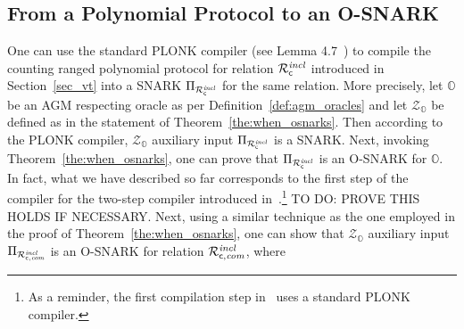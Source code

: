 \subsection{From a Polynomial Protocol to an O-SNARK}
\label{sec:interesting}
\noindent One can use the standard PLONK compiler (see Lemma 4.7~\cite{plonk}) to compile the 
counting ranged polynomial protocol for relation $\mathcal{R}^{\mathit{incl}}_{\mathsf{c}}$ introduced in Section~\ref{sec_vt} 
into a SNARK $\Pi_{\mathcal{R}^{\mathit{incl}}_{\mathsf{c}}}$ for the same relation. More precisely, let $\mathbb{O}$ be an 
AGM respecting oracle as per Definition~\ref{def:agm_oracles} and let $\mathcal{Z}_{\mathbb{O}}$ be defined as in the statement of Theorem~\ref{the:when_osnarks}. 
Then according to the PLONK compiler, $\mathcal{Z}_{\mathbb{O}}$ auxiliary input $\Pi_{\mathcal{R}^{\mathit{incl}}_{\mathsf{c}}}$ is a SNARK.
Next, invoking Theorem~\ref{the:when_osnarks}, one can prove that $\Pi_{\mathcal{R}^{\mathit{incl}}_{\mathsf{c}}}$ is an O-SNARK for $\mathbb{O}$. \\

\noindent In fact, what we have described so far corresponds to the first step of the compiler for the two-step compiler 
introduced in~\cite{LC_paper}.\footnote{As a reminder, the first compilation step in~\cite{LC_paper} uses a standard PLONK compiler.}
TO DO: PROVE THIS HOLDS IF NECESSARY. Next, using a similar technique as the one employed in the proof of Theorem~\ref{the:when_osnarks}, one can show that 
$\mathcal{Z}_{\mathbb{O}}$ auxiliary input $\Pi_{\mathcal{R}^{\mathit{incl}}_{\mathsf{c},\mathit{com}}}$ is an O-SNARK for relation $\mathcal{R}^{\mathit{incl}}_{\mathsf{c},\mathit{com}}$, where




